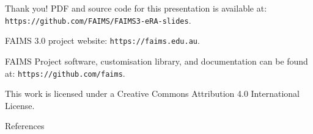 \documentclass[
	aspectratio=169, %
	12pt, %
	t, %
]{beamer}
\begin{document}
\begin{refsegment}
\begin{frame}
\begin{itemize}
    \end{itemize}



\end{frame} 


\begin{frame}{Thank you!}
PDF and source code for this presentation is available at: 
\texttt{https://github.com/FAIMS/FAIMS3-eRA-slides}.

FAIMS 3.0 project website: \texttt{https://faims.edu.au}.

FAIMS Project software, customisation library, and documentation can be found at:
\texttt{https://github.com/faims}.


This work is licensed under a Creative Commons Attribution 4.0 International License.

\end{frame}






\begin{frame}[allowframebreaks]{References}

\printbibliography[heading=none, segment=1]
\end{frame}


\end{refsegment}



\end{document}
